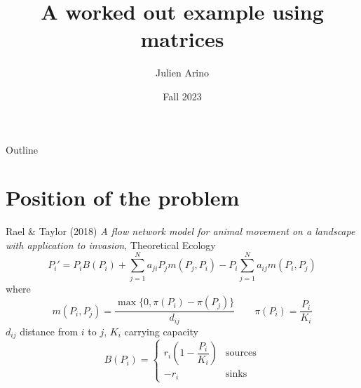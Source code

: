 \documentclass[aspectratio=169]{beamer}
\title{A worked out example using matrices}
\author{Julien Arino}
\date{Fall 2023}
\begin{document}
\begin{frame}
	\titlepage
\end{frame}
\addtocounter{page}{-1}
  
  
\begin{frame}{Outline}
	  \tableofcontents[hideallsubsections]
\end{frame}
\addtocounter{page}{-1}




\section{Position of the problem}
\begin{frame}{Rael \& Taylor (2018)}
	{\footnotesize\emph{A flow network model for animal movement on a landscape with application to invasion}, Theoretical Ecology}
	\vfill
	\[
	P_i' = P_iB(P_i)+\sum_{j=1}^N 
	a_{ji}P_jm(P_j,P_i)
	-P_i\sum_{j=1}^N a_{ij}m(P_i,P_j)
	\]
	where
	\[
	m(P_i, P_j) = \frac{\max\{0, \pi(P_i)-\pi(P_j)\}}{d_{ij}}
	\qquad \pi(P_i) = \frac{P_i}{K_i}
	\]
	$d_{ij}$ distance from $i$ to $j$, $K_i$ carrying capacity
	\[
	B(P_i) = \begin{cases}
	r_i\left(1-\dfrac{P_i}{K_i}\right) & \textrm{sources} \\
	-r_i & \textrm{sinks}
	\end{cases}
	\]
\end{frame}
	
\end{document}
